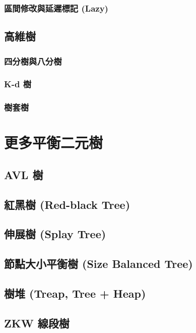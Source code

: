 \documentclass[12pt,a4paper,oneside]{report}
\begin{document}
\begin{CJK}{UTF8}{bkai}
\subsubsection{區間修改與延遲標記 (Lazy)}

\subsection{高維樹}

\subsubsection{四分樹與八分樹}

\subsubsection{K-d 樹}

\subsubsection{樹套樹}

\section{更多平衡二元樹}

\subsection{AVL 樹}

\subsection{紅黑樹 (Red-black Tree)}

\subsection{伸展樹 (Splay Tree)}

\subsection{節點大小平衡樹 (Size Balanced Tree)}

\subsection{樹堆 (Treap, Tree + Heap)}

\subsection{ZKW 線段樹}


\end{CJK}
\end{document}
